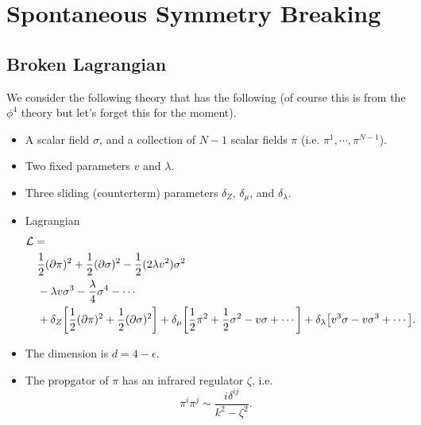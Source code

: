 \documentclass{article}
\begin{document}
\section{Spontaneous Symmetry Breaking}

\subsection{Broken Lagrangian}

We consider the following theory that has the following (of course this is from the $\phi^4$ theory but let's forget this for the moment).
\begin{itemize}
    \item A scalar field $\sigma$, and a collection of $N-1$ scalar fields $\pi$ (i.e. $\pi^1,\cdots,\pi^{N-1}$).
    \item Two fixed parameters $v$ and $\lambda$.
    \item Three sliding (counterterm) parameters $\delta_Z$, $\delta_\mu$, and $\delta_\lambda$.
    \item Lagrangian
    \begin{align*}
        & \mathcal{L} = \\
        & \quad \frac{1}{2}(\partial \pi)^2 + \frac{1}{2} (\partial \sigma)^2 - \frac{1}{2} (2\lambda v^2) \sigma^2 \\
        & \quad - \lambda v \sigma^3 - \frac{\lambda}{4}\sigma^4 - \cdots \\
        & \quad + \delta_Z\qty[\frac{1}{2}(\partial\pi)^2 + \frac{1}{2}(\partial \sigma)^2] + \delta_\mu\qty[\frac{1}{2} \pi^2 + \frac{1}{2}\sigma^2 - v \sigma + \cdots] + \delta_\lambda\qty[v^3 \sigma - v \sigma^3 + \cdots].
    \end{align*}
    \item The dimension is $d = 4-\epsilon$.
    \item The propgator of $\pi$ has an infrared regulator $\zeta$, i.e.
    \[ \pi^i\pi^j \sim \frac{i \delta^{ij}}{k^2 - \zeta^2}. \]
\end{itemize}
\end{document}
